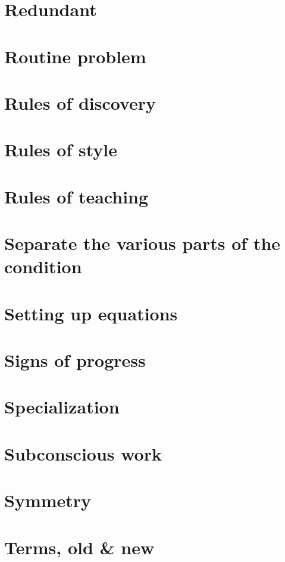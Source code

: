 \documentclass[oneside]{book}
\numberwithin{equation}{section}
\begin{document}
\section*{Redundant}

\section*{Routine problem}

\section*{Rules of discovery}

\section*{Rules of style}

\section*{Rules of teaching}

\section*{Separate the various parts of the condition}

\section*{Setting up equations}

\section*{Signs of progress}

\section*{Specialization}

\section*{Subconscious work}

\section*{Symmetry}

\section*{Terms, old \& new}
\end{document}
